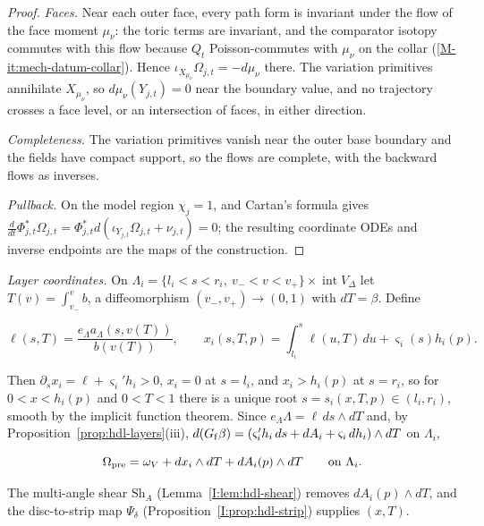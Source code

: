 \begin{proof}
\emph{Faces.} Near each outer face, every path form is invariant under the flow of the face moment $\mu_\nu$: the toric terms are invariant, and the comparator isotopy commutes with this flow because $Q_t$ Poisson-commutes with $\mu_\nu$ on the collar (\ref*{M-it:mech-datum-collar}). Hence $\iota_{X_{\mu_\nu}}\Omega_{j,t}=-d\mu_\nu$ there. The variation primitives annihilate $X_{\mu_\nu}$, so $d\mu_\nu(Y_{j,t})=0$ near the boundary value, and no trajectory crosses a face level, or an intersection of faces, in either direction.

\emph{Completeness.} The variation primitives vanish near the outer base boundary and the fields have compact support, so the flows are complete, with the backward flows as inverses.

\emph{Pullback.} On the model region $\chi_j=1$, and Cartan's formula gives $\frac d{dt}\Phi_{j,t}^*\Omega_{j,t}=\Phi_{j,t}^*d(\iota_{Y_{j,t}}\Omega_{j,t}+\nu_{j,t})=0$; the resulting coordinate ODEs and inverse endpoints are the maps of the construction.
\end{proof}

\emph{Layer coordinates.} On $\Lambda_i=\{l_i<s<r_i,\ v_-<v<v_+\}\times\operatorname{int}V_\Delta$ let $T(v)=\int_{v_-}^vb$, a diffeomorphism $(v_-,v_+)\to(0,1)$ with $dT=\beta$. Define

\begin{equation}\label{eq:hdl-layer-x}
 \ell(s,T)=\frac{e_\Lambda a_\Lambda(s,v(T))}{b(v(T))},\qquad
 x_i(s,T,p)=\int_{l_i}^s\ell(u,T)\,du+\varsigma_i(s)h_i(p).
\end{equation}

Then $\partial_sx_i=\ell+\varsigma_i'h_i>0$, $x_i=0$ at $s=l_i$, and $x_i>h_i(p)$ at $s=r_i$, so for $0<x<h_i(p)$ and $0<T<1$ there is a unique root $s=s_i(x,T,p)\in(l_i,r_i)$, smooth by the implicit function theorem. Since $e_\Lambda\Lambda=\ell\,ds\wedge dT$ and, by Proposition~\ref{prop:hdl-layers}(iii), $d(G_{\rm f}\beta)=(\varsigma_i'h_i\,ds+dA_i+\varsigma_i\,dh_i)\wedge dT$ on $\Lambda_i$,

\begin{equation}\label{eq:hdl-layer-form}
 \Omega_{\rm pre}=\omega_V+dx_i\wedge dT+dA_i(p)\wedge dT\qquad\text{on }\Lambda_i .
\end{equation}

The multi-angle shear $\mathrm{Sh}_A$ (Lemma~\ref{I:lem:hdl-shear}) removes $dA_i(p)\wedge dT$, and the disc-to-strip map $\Psi_\delta$ (Proposition~\ref{I:prop:hdl-strip}) supplies $(x,T)$.



